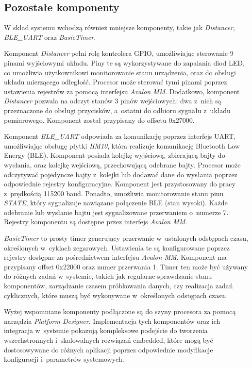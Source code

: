 \subsection{Pozostałe komponenty}
W skład systemu wchodzą również mniejsze komponenty, takie jak \textit{Distancer}, \textit{BLE\_UART} oraz \textit{BasicTimer}.

Komponent \textit{Distancer} pełni rolę kontrolera GPIO, umożliwiając sterowanie 9 pinami wyjściowymi układu. Piny te są wykorzystywane do zapalania diod LED, co umożliwia użytkownikowi monitorowanie stanu urządzenia, oraz do obsługi układu mierzącego odległość. Procesor może sterować tymi pinami poprzez ustawienia rejestrów za pomocą interfejsu \textit{Avalon MM}. Dodatkowo, komponent \textit{Distancer} pozwala na odczyt stanów 3 pinów wejściowych: dwa z~nich są przeznaczone do obsługi przycisków, a~ostatni do odbioru sygnału z~układu pomiarowego. Komponent został przypisany do offsetu 0x27000.

Komponent \textit{BLE\_UART} odpowiada za komunikację poprzez interfejs UART, umożliwiając obsługę płytki \textit{HM10}, która realizuje komunikację Bluetooth Low Energy (BLE). Komponent posiada kolejkę wyjściową, zbierającą bajty do wysłania, oraz kolejkę wejściową, przechowującą odebrane bajty. Procesor może odczytywać pojedyncze bajty z~kolejki lub dodawać dane do wysłania poprzez odpowiednie rejestry konfiguracyjne. Komponent jest przystosowany do pracy z~prędkością 115200 baud. Ponadto, umożliwia monitorowanie stanu pinu \textit{STATE}, który sygnalizuje nawiązane połączenie BLE (stan wysoki). Każde odebranie lub wysłanie bajtu jest sygnalizowane przerwaniem o~numerze 7. Rejestry komponentu są dostępne przez interfejs \textit{Avalon MM}.

\textit{BasicTimer} to prosty timer generujący przerwanie w~ustalonych odstępach czasu, określonych w~cyklach zegarowych. Ustawienia te są konfigurowane poprzez rejestry dostępne za pośrednictwem interfejsu \textit{Avalon MM}. Komponent ma przypisany offset 0x22000 oraz numer przerwania 1. Timer ten może być używany do różnych zadań w~systemie, takich jak regularne sprawdzanie stanu komponentów, zarządzanie czasem próbkowania danych, czy realizacja zadań cyklicznych, które muszą być wykonywane w~określonych odstępach czasu.
 
Wyżej wspomniane komponenty podłączone są do szyny procesora za pomocą narzędzia \textit{Platform Designer}. Implementacja tych komponentów oraz ich integracja w~systemie pokazują kompleksowe podejście do tworzenia wszechstronnych i~skalowalnych rozwiązań embedded, które mogą być dostosowywane do różnych aplikacji poprzez odpowiednie modyfikacje konfiguracji i~parametrów systemowych.

